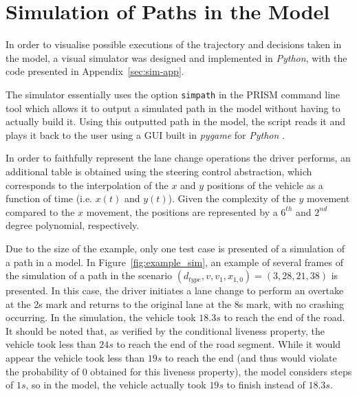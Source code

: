 \section{Simulation of Paths in the Model}
\label{sec:simulator}

In order to visualise possible executions of the trajectory and decisions taken in the model, a visual simulator was designed and implemented in \textit{Python}, with the code presented in Appendix~\ref{sec:sim-app}.

The simulator essentially uses the option \texttt{simpath} in the PRISM command line tool which allows it to output a simulated path in the model without having to actually build it. Using this outputted path in the model, the script reads it and plays it back to the user using a GUI built in \textit{pygame} for \textit{Python} \cite{pygame}. 

In order to faithfully represent the lane change operations the driver performs, an additional table is obtained using the steering control abstraction, which corresponds to the interpolation of the $x$ and $y$ positions of the vehicle as a function of time (i.e. $x(t)$ and $y(t)$). Given the complexity of the $y$ movement compared to the $x$ movement, the positions are represented by a $6^{th}$ and $2^{nd}$ degree polynomial, respectively. 

Due to the size of the example, only one test case is presented of a simulation of a path in a model. In Figure~\ref{fig:example_sim}, an example of several frames of the simulation of a path in the scenario $(d_{type}, v, v_1, x_{1,0}) = (3, 28, 21, 38)$ is presented. In this case, the driver initiates a lane change to perform an overtake at the 2s mark and returns to the original lane at the 8s mark, with no crashing occurring. In the simulation, the vehicle took $18.3s$ to reach the end of the road. It should be noted that, as verified by the conditional liveness property, the vehicle took less than $24s$ to reach the end of the road segment. While it would appear the vehicle took less than $19s$ to reach the end (and thus would violate the probability of $0$ obtained for this liveness property), the model considers steps of $1s$, so in the model, the vehicle actually took $19s$ to finish instead of $18.3s$.

